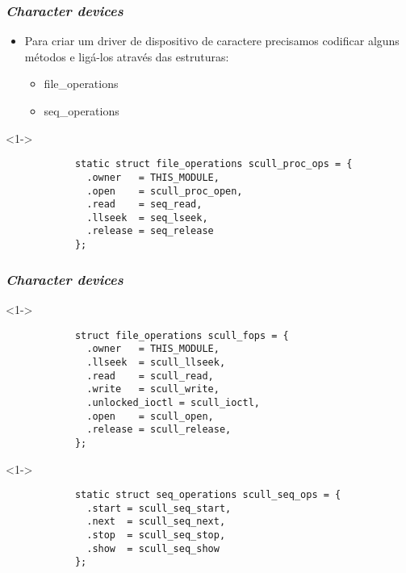 \begin{frame}[fragile]
	\frametitle{\textit{Character devices}}
	
	\begin{itemize}
		\item<1-> Para criar um driver de dispositivo de caractere precisamos codificar alguns métodos e ligá-los através das estruturas:
		\begin{itemize}
			\item<1-> file\_operations
			\item<1-> seq\_operations
		\end{itemize}
	\end{itemize}

	\lstset{language=C}
	
	\begin{block}<1->{}
		\begin{lstlisting}
			static struct file_operations scull_proc_ops = {
			  .owner   = THIS_MODULE,
			  .open    = scull_proc_open,
			  .read    = seq_read,
			  .llseek  = seq_lseek,
			  .release = seq_release
			};
		\end{lstlisting}
	\end{block}

\end{frame}


\begin{frame}[fragile]
	\frametitle{\textit{Character devices}}
	
	\lstset{language=C}

	\begin{block}<1->{}
		\begin{lstlisting}
			struct file_operations scull_fops = {
			  .owner   = THIS_MODULE,
			  .llseek  = scull_llseek,
			  .read    = scull_read,
			  .write   = scull_write,
			  .unlocked_ioctl = scull_ioctl,
			  .open    = scull_open,
			  .release = scull_release,
			};
		\end{lstlisting}
	\end{block}

	\begin{block}<1->{}
		\begin{lstlisting}
			static struct seq_operations scull_seq_ops = {
			  .start = scull_seq_start,
			  .next  = scull_seq_next,
			  .stop  = scull_seq_stop,
			  .show  = scull_seq_show
			};
		\end{lstlisting}
	\end{block}

\end{frame}



